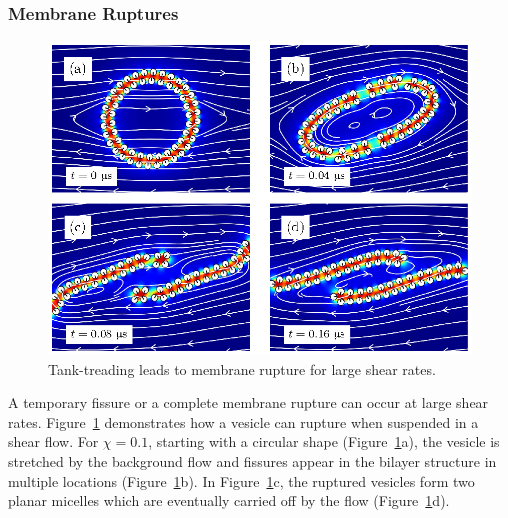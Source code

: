 \documentclass[lineno]{jfm}
\begin{document}
\subsubsection{Membrane Ruptures}
\begin{figure}
\centering
\includegraphics[width=11.32cm]{fig5.eps}
  \caption{\label{figure8} Tank-treading leads to membrane rupture for
  large shear rates.} 
\end{figure}
A temporary fissure or a complete membrane rupture can occur at large
shear rates. Figure~\ref{figure8} demonstrates how a vesicle can rupture
when suspended in a shear flow. For $\chi = 0.1$, starting with a
circular shape (Figure~\ref{figure8}a), the vesicle is stretched by the
background flow and fissures appear in the bilayer structure in multiple
locations (Figure~\ref{figure8}b). In Figure~\ref{figure8}c, the
ruptured vesicles form two planar micelles which are eventually carried
off by the flow (Figure~\ref{figure8}d). 
%
\end{document}

